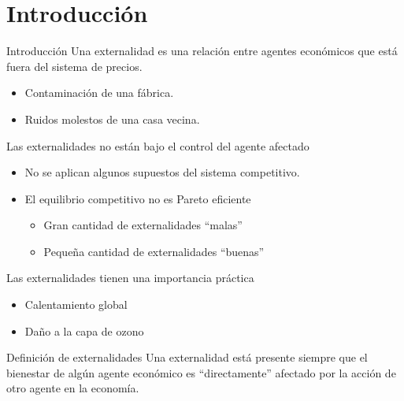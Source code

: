 \section{Introducción}

\begin{frame}{Introducción}
Una externalidad es una relación entre agentes económicos que está fuera del sistema de precios.
	\begin{itemize}
		\item Contaminación de una fábrica.
		\item Ruidos molestos de una casa vecina.
	\end{itemize}
Las externalidades no están bajo el control del agente afectado
	\begin{itemize}
		\item No se aplican algunos supuestos del sistema competitivo.
		\item El equilibrio competitivo no es Pareto eficiente
				\begin{itemize}
					\item Gran cantidad de externalidades ``malas''
					\item Pequeña cantidad de externalidades ``buenas''
				\end{itemize}
	\end{itemize}
Las externalidades tienen una importancia práctica
	\begin{itemize}
		\item Calentamiento global
		\item Daño a la capa de ozono
	\end{itemize}
\end{frame}
\begin{frame}{Definición de externalidades}
Una externalidad está presente siempre que el bienestar de algún agente económico es “directamente” afectado por la acción de otro agente en la economía.\\
	\begin{center}
		
	\end{center}
\end{frame}
